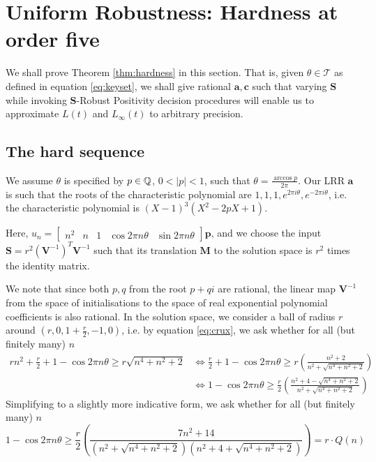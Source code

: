 \section{Uniform Robustness: Hardness at order five}
\label{section:hardness}
We shall prove Theorem \ref{thm:hardness} in this section. That is, given $\theta \in \mathcal{T}$ as defined in equation \ref{eq:keyset}, we shall give rational $\mathbf{a}, \mathbf{c}$ such that varying $\mathbf{S}$ while invoking $\mathbf{S}$-Robust Positivity decision procedures will enable us to approximate $L(t)$ and $L_\infty(t)$ to arbitrary precision.

\subsection{The hard sequence}
We assume $\theta$ is specified by $p \in \mathbb{Q}$, $0 < |p| < 1$, such that $\theta = \frac{\arccos p}{2\pi}$. Our LRR $\mathbf{a}$ is such that the roots of the characteristic polynomial are $1, 1, 1, e^{2\pi i\theta}, e^{-2\pi i \theta}$, i.e. the characteristic polynomial is 
$
(X- 1)^3(X^2 - 2pX + 1)
$.

Here, 
$
u_n = \begin{bmatrix}
n^2 & n & 1 & \cos 2\pi n\theta & \sin 2\pi n\theta
\end{bmatrix}
\mathbf{p}
$, and we choose the input $\mathbf{S} = r^2(\mathbf{V}^{-1})^T\mathbf{V}^{-1}$ such that its translation $\mathbf{M}$ to the solution space is $r^2$ times the identity matrix.

We note that since both $p, q$ from the root $p + qi$ are rational, the linear map $\mathbf{V}^{-1}$ from the space of initialisations to the space of real exponential polynomial coefficients is also rational. In the solution space, we consider a ball of radius $r$ around $(r, 0, 1+\frac{r}{2}, -1, 0)$, i.e. by equation \ref{eq:crux}, we ask whether for all (but finitely many) $n$
\begin{align*}
rn^2 + \frac{r}{2} + 1 - \cos 2\pi n\theta \ge r\sqrt{n^4 + n^2 + 2} 
&\Leftrightarrow \frac{r}{2} + 1 - \cos 2\pi n\theta \ge r\left(\frac{n^2 + 2}{n^2 + \sqrt{n^4 + n^2 + 2}}\right) \\
&\Leftrightarrow 1 - \cos 2\pi n\theta \ge \frac{r}{2}\left(\frac{n^2 + 4 - \sqrt{n^4 + n^2 + 2}}{n^2 + \sqrt{n^4 + n^2 + 2}}\right)
\end{align*}
Simplifying to a slightly more indicative form, we ask whether for all (but finitely many) $n$
\begin{equation}
\label{eq:pivotal}
1 - \cos 2\pi n\theta \ge \frac{r}{2}\left(\frac{7n^2 + 14}{(n^2 + \sqrt{n^4 + n^2 + 2})(n^2 +4+  \sqrt{n^4 + n^2 + 2})}\right) = r\cdot Q(n)
\end{equation}


